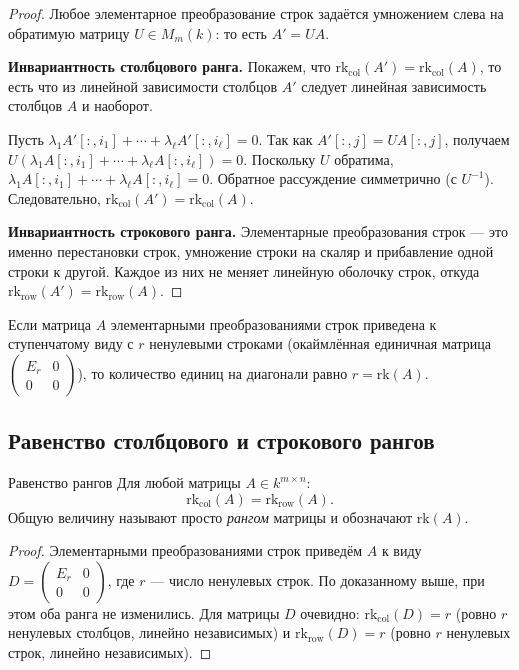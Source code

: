 \begin{proof}
Любое элементарное преобразование строк задаётся умножением слева на обратимую матрицу $U \in M_m(k)$: то есть $A' = UA$.

\textbf{Инвариантность столбцового ранга.} Покажем, что $\mathrm{rk}_{\mathrm{col}}(A') = \mathrm{rk}_{\mathrm{col}}(A)$, то есть что из линейной зависимости столбцов $A'$ следует линейная зависимость столбцов $A$ и наоборот.

Пусть $\lambda_1 A'[{:},i_1] + \cdots + \lambda_\ell A'[{:},i_\ell] = 0$. Так как $A'[{:},j] = UA[{:},j]$, получаем $U(\lambda_1 A[{:},i_1] + \cdots + \lambda_\ell A[{:},i_\ell]) = 0$. Поскольку $U$ обратима, $\lambda_1 A[{:},i_1] + \cdots + \lambda_\ell A[{:},i_\ell] = 0$. Обратное рассуждение симметрично (с $U^{-1}$). Следовательно, $\mathrm{rk}_{\mathrm{col}}(A') = \mathrm{rk}_{\mathrm{col}}(A)$.

\textbf{Инвариантность строкового ранга.} Элементарные преобразования строк — это именно перестановки строк, умножение строки на скаляр и прибавление одной строки к другой. Каждое из них не меняет линейную оболочку строк, откуда $\mathrm{rk}_{\mathrm{row}}(A') = \mathrm{rk}_{\mathrm{row}}(A)$.
\end{proof}

\begin{Remark}{}{}
    Если матрица $A$ элементарными преобразованиями строк приведена к ступенчатому виду с $r$ ненулевыми строками (окаймлённая единичная матрица $\begin{pmatrix} E_r & 0 \\ 0 & 0 \end{pmatrix}$), то количество единиц на диагонали равно $r = \mathrm{rk}(A)$.
\end{Remark}

\subsection{Равенство столбцового и строкового рангов}

\begin{Theorem}{Равенство рангов}{}
    Для любой матрицы $A \in k^{m \times n}$:
    \[
        \mathrm{rk}_{\mathrm{col}}(A) = \mathrm{rk}_{\mathrm{row}}(A).
    \]
    Общую величину называют просто \emph{рангом} матрицы и обозначают $\mathrm{rk}(A)$.
\end{Theorem}

\begin{proof}
Элементарными преобразованиями строк приведём $A$ к виду $D = \begin{pmatrix} E_r & 0 \\ 0 & 0 \end{pmatrix}$, где $r$ — число ненулевых строк. По доказанному выше, при этом оба ранга не изменились. Для матрицы $D$ очевидно: $\mathrm{rk}_{\mathrm{col}}(D) = r$ (ровно $r$ ненулевых столбцов, линейно независимых) и $\mathrm{rk}_{\mathrm{row}}(D) = r$ (ровно $r$ ненулевых строк, линейно независимых).
\end{proof}

